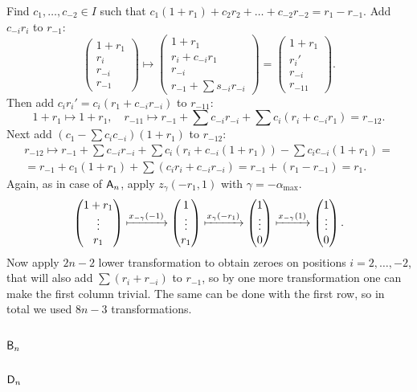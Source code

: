 Find $c_1,\ldots,c_{-2}\in I$ such that $c_1(1+r_1)+c_2r_2+\ldots+c_{-2}r_{-2}=r_1-r_{-1}$. Add $c_{-i}r_i$ to $r_{-1}$:
\[
\begin{pmatrix}
1+r_1 \\ r_i \\ r_{-i} \\ r_{-1}
\end{pmatrix}
\mapsto
\begin{pmatrix}
1+r_1 \\ r_i+c_{-i}r_1 \\ r_{-i} \\ r_{-1}+\sum s_{-i}r_{-i}
\end{pmatrix}=
\begin{pmatrix}
1+r_1 \\ r_i' \\ r_{-i} \\ r_{-11}
\end{pmatrix}.
\]
Then add $c_ir_i'=c_i(r_1+c_{-i}r_{-i})$ to $r_{-11}$:
\[
1+r_1\mapsto 1+r_1,\quad r_{-11}\mapsto r_{-1}+\sum c_{-i}r_{-i}+\sum c_i(r_i+c_{-i}r_1)=r_{-12}.
\]
Next add $(c_1-\sum c_ic_{-i})(1+r_1)$ to $r_{-12}$:
\begin{multline*}
r_{-12}\mapsto r_{-1}+\sum c_{-i}r_{-i}+\sum c_i(r_i+c_{-i}(1+r_1))-\sum c_ic_{-i}(1+r_1)=\\=r_{-1}+c_1(1+r_1)+\sum(c_ir_i+c_{-i}r_{-i})=r_{-1}+(r_1-r_{-1})=r_1.
\end{multline*}
Again, as in case of $\mathsf{A}_n$, apply $z_\gamma(-r_1,1)$ with $\gamma=-\alpha_\mathrm{max}$.
\[
\begin{pmatrix}1+r_1 \\ \vdots \\ r_1\end{pmatrix}
\xmapsto{x_{-\gamma}(-1)}
\begin{pmatrix}1 \\ \vdots \\ r_1\end{pmatrix}
\xmapsto{x_\gamma(-r_1)}
\begin{pmatrix}1 \\ \vdots \\ 0\end{pmatrix}
\xmapsto{x_{-\gamma}(1)}
\begin{pmatrix}1 \\ \vdots \\ 0\end{pmatrix}.
\]
Now apply $2n-2$ lower transformation to obtain zeroes on positions $i=2,\ldots,-2$, that will also add $\sum (r_i+r_{-i})$ to $r_{-1}$, so by one more transformation one can make the first column trivial. The same can be done with the first row, so in total we used $8n-3$ transformations.

\subsection{$\mathsf{B}_n$}
\subsection{$\mathsf{D}_n$}